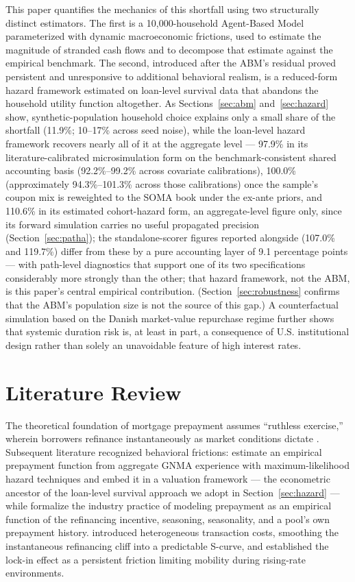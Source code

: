 \documentclass[12pt]{article}
\begin{document}
This paper quantifies the mechanics of this shortfall using two structurally distinct estimators. The first is a 10,000-household Agent-Based Model parameterized with dynamic macroeconomic frictions, used to estimate the magnitude of stranded cash flows and to decompose that estimate against the empirical benchmark. The second, introduced after the ABM's residual proved persistent and unresponsive to additional behavioral realism, is a reduced-form hazard framework estimated on loan-level survival data that abandons the household utility function altogether. As Sections~\ref{sec:abm} and~\ref{sec:hazard} show, synthetic-population household choice explains only a small share of the shortfall (11.9\%; 10--17\% across seed noise), while the loan-level hazard framework recovers nearly all of it at the aggregate level --- 97.9\% in its literature-calibrated microsimulation form on the benchmark-consistent shared accounting basis (92.2\%--99.2\% across covariate calibrations), 100.0\% (approximately 94.3\%--101.3\% across those calibrations) once the sample's coupon mix is reweighted to the SOMA book under the ex-ante priors, and 110.6\% in its estimated cohort-hazard form, an aggregate-level figure only, since its forward simulation carries no useful propagated precision (Section~\ref{sec:patha}); the standalone-scorer figures reported alongside (107.0\% and 119.7\%) differ from these by a pure accounting layer of 9.1 percentage points --- with path-level diagnostics that support one of its two specifications considerably more strongly than the other; that hazard framework, not the ABM, is this paper's central empirical contribution. (Section~\ref{sec:robustness} confirms that the ABM's population size is not the source of this gap.) A counterfactual simulation based on the Danish market-value repurchase regime further shows that systemic duration risk is, at least in part, a consequence of U.S. institutional design rather than solely an unavoidable feature of high interest rates.

\section{Literature Review}\label{sec:lit}

The theoretical foundation of mortgage prepayment assumes ``ruthless exercise,'' wherein borrowers refinance instantaneously as market conditions dictate \citep{dunn1981}. Subsequent literature recognized behavioral frictions: \citet{schwartz1989} estimate an empirical prepayment function from aggregate GNMA experience with maximum-likelihood hazard techniques and embed it in a valuation framework --- the econometric ancestor of the loan-level survival approach we adopt in Section~\ref{sec:hazard} --- while \citet{richard1989} formalize the industry practice of modeling prepayment as an empirical function of the refinancing incentive, seasoning, seasonality, and a pool's own prepayment history. \citet{stanton1995} introduced heterogeneous transaction costs, smoothing the instantaneous refinancing cliff into a predictable S-curve, and \citet{quigley1987,quigley2002} established the lock-in effect as a persistent friction limiting mobility during rising-rate environments.
\end{document}
